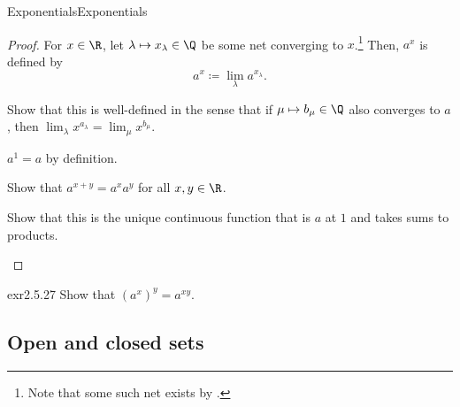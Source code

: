 \begin{thm}{Exponentials}{Exponentials}
\begin{proof}
For $x\in \R$, let $\lambda \mapsto x_\lambda \in \Q$ be some net converging to $x$.\footnote{Note that some such net exists by .}  Then, $a^x$ is defined by
\begin{equation}
a^x\coloneqq \lim _\lambda a^{x_\lambda}.
\end{equation}
\begin{exr}[breakable=false]{}{}
Show that this is well-defined in the sense that if $\mu \mapsto b_\mu \in \Q$ also converges to $a$, then $\lim _\lambda x^{a_\lambda}=\lim _\mu x^{b_\mu}$.
\end{exr}

$a^1=a$ by definition.
\begin{exr}[breakable=false]{}{}
Show that $a^{x+y}=a^xa^y$ for all $x,y\in \R$.
\end{exr}

\begin{exr}[breakable=false]{}{}
Show that this is the unique continuous function that is $a$ at $1$ and takes sums to products.
\end{exr}
\end{proof}
\end{thm}
\begin{exr}{}{exr2.5.27}
Show that $(a^x)^y=a^{xy}$.
\end{exr}

\subsection{Open and closed sets}

